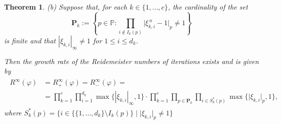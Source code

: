 \documentclass[12pt, a4paper]{amsart}
\newtheorem{theorem}{Theorem}
\begin{document}
\begin{theorem}
  \smallskip

 \rm{(b)} Suppose that, for each $k \in \{1, \ldots, c\}$, the cardinality of the set
$$
\mathbf{P}_k:=\left\{p\in \mathbb{P}\colon \prod_{i \not\in I_k(p)} \lvert \xi_{k,i}^{\, n} - 1 \rvert_p \neq 1\right\}
$$
is finite  and that
  $| \xi_{k,i} |_\infty \neq 1$ for $1 \le i \le d_k$.

  Then the growth rate of the  Reidemeister numbers of iterations exists and is given by
  \begin{align}\label{eq:key-formula-growth}
  \begin{split}
    R^{\infty}(\varphi) &=R^{\infty}_{+}(\varphi)=R^{\infty}_{-}(\varphi)= \\
    &= \prod_{k=1}^{c}
    \prod_{i=1}^{d_k} \max\{|\xi_{k,i}|_\infty,1\}\cdot\prod_{k=1}^{c}\prod_{p \in \mathbf{P}_k}
    \prod_{i \in S^*_k(p)} \max \{ \lvert \xi_{k,i} \rvert_p, 1\},
  \end{split}
  \end{align}
  where  $S^*_k(p) = \{i \in \{ \{1, \ldots, d_k\} \setminus I_k(p)  \}\mid \lvert \xi_{k,i} \rvert_p \neq 1\}$
\end{theorem}
\end{document}
